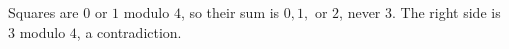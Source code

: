 Squares are $0$ or $1$ modulo $4$, so their sum is $0,1,$ or $2$, never $3$. The right side is $3$ modulo $4$, a contradiction.
